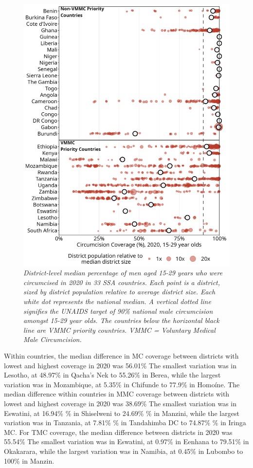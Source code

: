 \documentclass{article}
\begin{document}
\begin{figure}[H]
    \centering
    \includegraphics[width=.9\linewidth]
    {figures/paper/02_subnat_plot.png}
    \caption{\emph{District-level median percentage of men aged 15-29 years who were circumcised in 2020 in 33 SSA countries.
    Each point is a district, sized by district population relative to average district size.
    Each white dot represents the national median. 
    A vertical dotted line signifies the UNAIDS target of 90\% national male circumcision amongst 15-29 year olds. The countries below the horizontal black line are VMMC priority countries. VMMC = Voluntary Medical Male Circumcision.}}
\end{figure}

Within countries, the median difference in MC coverage between districts with lowest and highest coverage in 2020 was 56.01\% The smallest variation was in Lesotho, at 48.97\% in Qacha’s Nek to 55.26\% in Berea, while the largest variation was in Mozambique, at 5.35\% in Chifunde to 77.9\% in Homoíne. 
The median difference within countries in MMC coverage between districts with lowest and highest coverage in 2020 was 38.69\% The smallest variation was in Eswatini, at 16.94\% \% in Shiselweni to 24.69\% \% in Manzini, while the largest variation was in Tanzania, at 7.81\% \% in Tandahimba DC to 74.87\% \% in Iringa MC. 
For TMC coverage, the median difference between districts in 2020 was 55.54\% The smallest variation was in Eswatini, at 0.97\% in Eenhana to 79.51\% in Okakarara, while the largest variation was in Namibia, at 0.45\% in Lubombo to 100\% in Manzin. 
\end{document}
